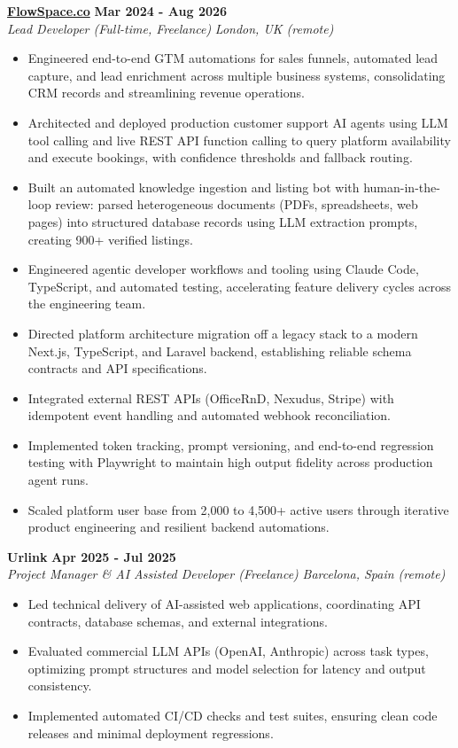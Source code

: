 \documentclass[10pt,a4paper]{article}
\newcommand{\role}[4]{%
  \textbf{#1} \hfill \textbf{#2}\\[1pt]%
  \textit{#3} \hfill \textit{#4}\\[2pt]%
}
\begin{document}
\role{\href{https://flowspace.co}{FlowSpace.co}}{Mar 2024 - Aug 2026}{Lead Developer (Full-time, Freelance)}{London, UK (remote)}
\begin{itemize}
  \item Engineered end-to-end GTM automations for sales funnels, automated lead capture, and lead enrichment across multiple business systems, consolidating CRM records and streamlining revenue operations.
  \item Architected and deployed production customer support AI agents using LLM tool calling and live REST API function calling to query platform availability and execute bookings, with confidence thresholds and fallback routing.
  \item Built an automated knowledge ingestion and listing bot with human-in-the-loop review: parsed heterogeneous documents (PDFs, spreadsheets, web pages) into structured database records using LLM extraction prompts, creating 900+ verified listings.
  \item Engineered agentic developer workflows and tooling using Claude Code, TypeScript, and automated testing, accelerating feature delivery cycles across the engineering team.
  \item Directed platform architecture migration off a legacy stack to a modern Next.js, TypeScript, and Laravel backend, establishing reliable schema contracts and API specifications.
  \item Integrated external REST APIs (OfficeRnD, Nexudus, Stripe) with idempotent event handling and automated webhook reconciliation.
  \item Implemented token tracking, prompt versioning, and end-to-end regression testing with Playwright to maintain high output fidelity across production agent runs.
  \item Scaled platform user base from 2,000 to 4,500+ active users through iterative product engineering and resilient backend automations.
\end{itemize}

\role{Urlink}{Apr 2025 - Jul 2025}{Project Manager \& AI Assisted Developer (Freelance)}{Barcelona, Spain (remote)}
\begin{itemize}
  \item Led technical delivery of AI-assisted web applications, coordinating API contracts, database schemas, and external integrations.
  \item Evaluated commercial LLM APIs (OpenAI, Anthropic) across task types, optimizing prompt structures and model selection for latency and output consistency.
  \item Implemented automated CI/CD checks and test suites, ensuring clean code releases and minimal deployment regressions.
\end{itemize}
\end{document}
